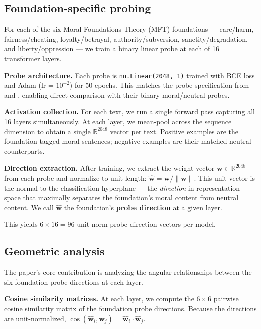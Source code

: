 \subsection{Foundation-specific probing}\label{foundation-specific-probing}

For each of the six Moral Foundations Theory (MFT) foundations ---
care/harm, fairness/cheating, loyalty/betrayal, authority/subversion,
sanctity/degradation, and liberty/oppression
\citep{haidt2012righteous, graham2013mft} --- we train a binary
linear probe at each of 16 transformer layers.

\textbf{Probe architecture.} Each probe is \texttt{nn.Linear(2048,\ 1)} trained
with BCE loss and Adam (lr = \(10^{-2}\)) for 50 epochs. This
matches the probe specification from
\citet{reblitzrichardson2026fragility} and
\citet{reblitzrichardson2026dilution}, enabling direct comparison
with their binary moral/neutral probes.

\textbf{Activation collection.} For each text, we run a single forward
pass capturing all 16 layers simultaneously. At each layer, we
mean-pool across the sequence dimension to obtain a single
\(\mathbb{R}^{2048}\) vector per text. Positive examples are the
foundation-tagged moral sentences; negative examples are their
matched neutral counterparts.

\textbf{Direction extraction.} After training, we extract the weight
vector \(\mathbf{w} \in \mathbb{R}^{2048}\) from each probe and
normalize to unit length: \(\hat{\mathbf{w}} = \mathbf{w} /
\|\mathbf{w}\|\). This unit vector is the normal to the
classification hyperplane --- the \emph{direction} in representation
space that maximally separates the foundation's moral content from
neutral content. We call \(\hat{\mathbf{w}}\) the foundation's
\textbf{probe direction} at a given layer.

This yields \(6 \times 16 = 96\) unit-norm probe direction vectors
per model.

\subsection{Geometric analysis}\label{geometric-analysis}

The paper's core contribution is analyzing the angular relationships
between the six foundation probe directions at each layer.

\textbf{Cosine similarity matrices.} At each layer, we compute the
\(6 \times 6\) pairwise cosine similarity matrix of the foundation
probe directions. Because the directions are unit-normalized,
\(\cos(\hat{\mathbf{w}}_i, \hat{\mathbf{w}}_j) =
\hat{\mathbf{w}}_i \cdot \hat{\mathbf{w}}_j\).

